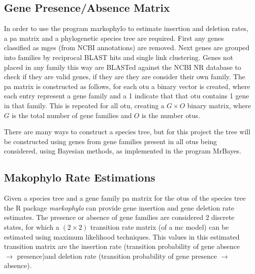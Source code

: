 \documentclass[12pt,letter]{article}
\begin{document}
\subsection{Gene Presence/Absence Matrix}
In order to use the program markophylo to estimate insertion and deletion rates, a \ac{pa} matrix and a phylogenetic species tree are required.
First any genes classified as \ac{mge}s (from NCBI annotations) are removed.
Next genes are grouped into families by reciprocal BLAST hits and single link clustering.
Genes not placed in any family this way are BLASTed against the NCBI NR database to check if they are valid genes, if they are they are consider their own family.
The \ac{pa} matrix is constructed as follows, for each \ac{otu} a binary vector is created, where each entry represent a gene family and a 1 indicate that that \ac{otu} contains 1 gene in that family.
This is repeated for all \ac{otu}, creating a $G \times O$ binary matrix, where $G$ is the total number of gene families and $O$ is the number \ac{otu}s.\par
There are many ways to construct a species tree, but for this project the tree will be constructed using genes from gene families present in all \ac{otu}s being considered, using Bayesian methods, as implemented in the program MrBayes.
\subsection{Makophylo Rate Estimations}
Given a species tree and a gene family \ac{pa} matrix for the \ac{otu}s of the species tree the R package \textit{markophylo} can provide gene insertion and gene deletion rate estimates\citep{marko}.
The presence or absence of gene families are considered 2 discrete states, for which a $(2\times 2)$ transition rate matrix (of a \ac{mc} model) can be estimated using maximum likelihood techniques.
This values in this estimated transition matrix are the insertion rate (transition probability of gene absence $\to$ presence)and deletion rate (transition probability of gene presence $\to$ absence)\citep{marko}.
\end{document}
